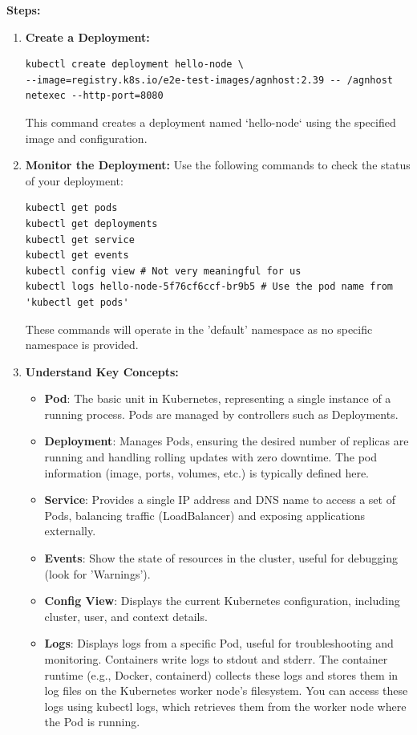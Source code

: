 \documentclass{article}
\begin{document}
\textbf{Steps:}
\begin{enumerate}
    \item \textbf{Create a Deployment:}
    \begin{lstlisting}
kubectl create deployment hello-node \
--image=registry.k8s.io/e2e-test-images/agnhost:2.39 -- /agnhost netexec --http-port=8080
    \end{lstlisting}
    This command creates a deployment named `hello-node` using the specified image and configuration.

    \item \textbf{Monitor the Deployment:}
    Use the following commands to check the status of your deployment:
    \begin{lstlisting}
kubectl get pods
kubectl get deployments
kubectl get service
kubectl get events
kubectl config view # Not very meaningful for us
kubectl logs hello-node-5f76cf6ccf-br9b5 # Use the pod name from 'kubectl get pods'
    \end{lstlisting}
    These commands will operate in the 'default' namespace as no specific namespace is provided.

    \item \textbf{Understand Key Concepts:}
    \begin{itemize}
      \item \textbf{Pod}: The basic unit in Kubernetes, representing a single instance of a running process. Pods are managed by controllers such as Deployments.
      
      \item \textbf{Deployment}: Manages Pods, ensuring the desired number of replicas are running and handling rolling updates with zero downtime. The pod information (image, ports, volumes, etc.) is typically defined here.
                  
      \item \textbf{Service}: Provides a single IP address and DNS name to access a set of Pods, balancing traffic (LoadBalancer) and exposing applications externally.
      
      \item \textbf{Events}: Show the state of resources in the cluster, useful for debugging (look for 'Warnings').
      
      \item \textbf{Config View}: Displays the current Kubernetes configuration, including cluster, user, and context details.
      
      \item \textbf{Logs}: Displays logs from a specific Pod, useful for troubleshooting and monitoring. Containers write logs to stdout and stderr. The container runtime (e.g., Docker, containerd) collects these logs and stores them in log files on the Kubernetes worker node's filesystem. You can access these logs using kubectl logs, which retrieves them from the worker node where the Pod is running.
    

\end{itemize}
\end{enumerate}
\end{document}
